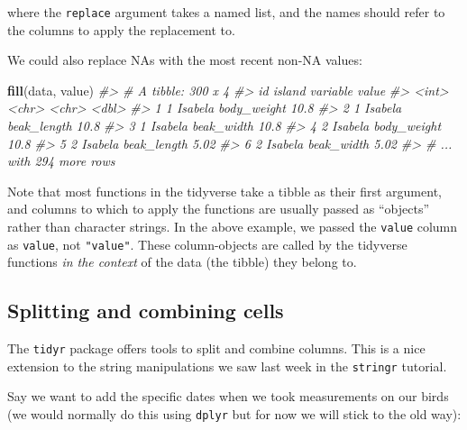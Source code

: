 \documentclass[]{book}
\newenvironment{Shaded}{}{}
\newcommand{\CommentTok}[1]{\textcolor[rgb]{0.38,0.63,0.69}{\textit{#1}}}
\newcommand{\KeywordTok}[1]{\textcolor[rgb]{0.00,0.44,0.13}{\textbf{#1}}}
\newcommand{\NormalTok}[1]{#1}
\begin{document}
where the \texttt{replace} argument takes a named list, and the names should refer to the columns to apply the replacement to.

We could also replace NAs with the most recent non-NA values:

\begin{Shaded}
\begin{Highlighting}[]
\KeywordTok{fill}\NormalTok{(data, value)}
\CommentTok{#> # A tibble: 300 x 4}
\CommentTok{#>      id island  variable    value}
\CommentTok{#>   <int> <chr>   <chr>       <dbl>}
\CommentTok{#> 1     1 Isabela body_weight 10.8 }
\CommentTok{#> 2     1 Isabela beak_length 10.8 }
\CommentTok{#> 3     1 Isabela beak_width  10.8 }
\CommentTok{#> 4     2 Isabela body_weight 10.8 }
\CommentTok{#> 5     2 Isabela beak_length  5.02}
\CommentTok{#> 6     2 Isabela beak_width   5.02}
\CommentTok{#> # ... with 294 more rows}
\end{Highlighting}
\end{Shaded}

Note that most functions in the tidyverse take a tibble as their first argument, and columns to which to apply the functions are usually passed as ``objects'' rather than character strings. In the above example, we passed the \texttt{value} column as \texttt{value}, not \texttt{"value"}. These column-objects are called by the tidyverse functions \emph{in the context} of the data (the tibble) they belong to.

\hypertarget{splitting-and-combining-cells}{%
\subsection{Splitting and combining cells}\label{splitting-and-combining-cells}}

The \texttt{tidyr} package offers tools to split and combine columns. This is a nice extension to the string manipulations we saw last week in the \texttt{stringr} tutorial.

Say we want to add the specific dates when we took measurements on our birds (we would normally do this using \texttt{dplyr} but for now we will stick to the old way):
\end{document}
